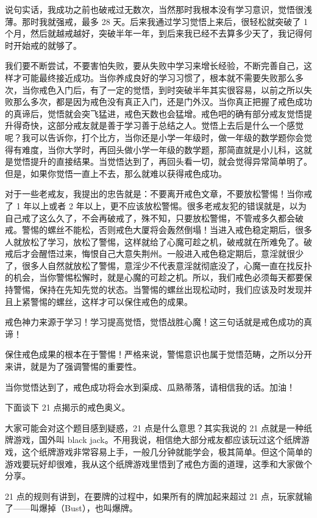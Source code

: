 \documentclass[fontset=founder]{ctexart}
\begin{document}
说句实话，我成功之前也破戒过无数次，当然那时我根本没有学习意识，觉悟很浅薄。那时我就强戒，最多 28 天。后来我通过学习觉悟上来后，很轻松就突破了 1 个月，然后就越戒越好，突破半年一年，到后来我已经不去算多少天了，我记得何时开始戒的就够了。

我们要不断尝试，不要害怕失败，要从失败中学习来增长经验，不断完善自己，这样才可能最终接近成功。当你养成良好的学习习惯了，根本就不需要失败那么多次，当你戒色入门后，有了一定的觉悟，到时突破半年其实很容易，以前之所以失败那么多次，都是因为戒色没有真正入门，还是门外汉。当你真正把握了戒色成功的真谛后，觉悟就会突飞猛进，戒色天数也会猛增。戒色吧的确有部分戒友觉悟提升得奇快，这部分戒友就是善于学习善于总结之人。觉悟上去后是什么一个感觉呢？我可以告诉你，打个比方，当你还是小学一年级时，做一年级的数学题你会觉得有难度，当你大学时，再回头做小学一年级的数学题，那简直就是小儿科，这就是觉悟提升的直接结果。当觉悟达到了，再回头看一切，就会觉得异常简单明了。但是，如果你觉悟一直上不去，那么就难以获得戒色成功。

对于一些老戒友，我提出的忠告就是：不要离开戒色文章，不要放松警惕！当你戒了 1 年以上或者 2 年以上，更不应该放松警惕。很多老戒友犯的错误就是，以为自己戒了这么久了，不会再破戒了，殊不知，只要放松警惕，不管戒多久都会破戒。警惕的螺丝不能松，否则戒色大厦将会轰然倒塌！当进入戒色稳定期后，很多人就放松了学习，放松了警惕，这样就给了心魔可趁之机，破戒就在所难免了。破戒后才会醒悟过来，悔恨自己大意失荆州。一般进入戒色稳定期后，意淫就很少了，很多人自然就放松了警惕，意淫少不代表意淫就彻底没了，心魔一直在找反扑的机会，当你警惕松懈时，就是心魔的可趁之机。所以，我们戒色必须每天都要保持警惕，保持在先知先觉的状态。当警惕的螺丝出现松动时，我们应该及时发现并且上紧警惕的螺丝，这样才可以保住戒色的成果。

戒色神力来源于学习！学习提高觉悟，觉悟战胜心魔！这三句话就是戒色成功的真谛！

保住戒色成果的根本在于警惕！严格来说，警惕意识也属于觉悟范畴，之所以分开来讲，就是为了强调警惕的重要性。

当你觉悟达到了，戒色成功将会水到渠成、瓜熟蒂落，请相信我的话。加油！

下面谈下 21 点揭示的戒色奥义。

大家可能会对这个题目感到疑惑，21 点是什么意思？其实我说的 21 点就是一种纸牌游戏，国外叫 black jack。不用我说，相信绝大部分戒友都应该玩过这个纸牌游戏，这个纸牌游戏非常容易上手，一般几分钟就能学会，极其简单。但这个简单的游戏要玩好却很难，我从这个纸牌游戏里悟到了戒色方面的道理，这季和大家做个分享。

21 点的规则有讲到，在要牌的过程中，如果所有的牌加起来超过 21 点，玩家就输了——叫爆掉（Bust），也叫爆牌。
\end{document}
